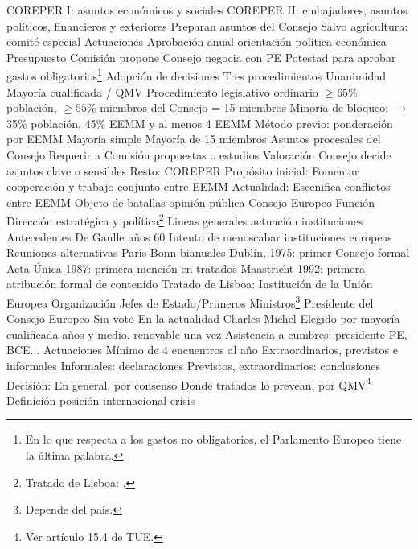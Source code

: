 \documentclass{nuevotema}
\begin{document}
\begin{esquemal}
				\4[] COREPER I: asuntos económicos y sociales
				\4[] COREPER II: embajadores, asuntos políticos, financieros y exteriores
				\4[] Preparan asuntos del Consejo
				\4[] Salvo agricultura: comité especial
			\3 Actuaciones
				\4 Aprobación anual orientación política económica
				\4 Presupuesto
				\4[] Comisión propone
				\4[] Consejo negocia con PE
				\4[] Potestad para aprobar gastos obligatorios\footnote{En lo que respecta a los gastos no obligatorios, el Parlamento Europeo tiene la última palabra.}
				\4 Adopción de decisiones
				\4[] Tres procedimientos
				\4[1] Unanimidad
				\4[2] Mayoría cualificada / QMV
				\4[] Procedimiento legislativo ordinario
				\4[] $\geq 65\%$ población, $\geq 55\%$ miembros del Consejo = 15 miembros
				\4[] Minoría de bloqueo:
				\4[] $\to$ 35\% población, 45\% EEMM y al menos 4 EEMM
				\4[] Método previo: ponderación por EEMM
				\4[3] Mayoría simple
				\4[] Mayoría de 15 miembros
				\4[] Asuntos procesales del Consejo
				\4[] Requerir a Comisión propuestas o estudios
			\3 Valoración
				\4 Consejo decide asuntos clave o sensibles
				\4[] Resto: COREPER
				\4 Propósito inicial:
				\4[] Fomentar cooperación y trabajo conjunto entre EEMM
				\4 Actualidad:
				\4[] Escenifica conflictos entre EEMM
				\4[] Objeto de batallas opinión pública
		\2 Consejo Europeo
			\3 Función
				\4 Dirección estratégica y política\footnote{Tratado de Lisboa: .}
				\4 Lineas generales actuación instituciones
			\3 Antecedentes
				\4 De Gaulle años 60
				\4[] Intento de menoscabar instituciones europeas
				\4 Reuniones alternativas París-Bonn bianuales
				\4 Dublín, 1975: primer Consejo formal
				\4 Acta Única 1987: primera mención en tratados
				\4 Maastricht 1992:
				\4[] primera atribución formal de contenido
				\4 Tratado de Lisboa:
				\4[] Institución de la Unión Europea
			\3 Organización
				\4 Jefes de Estado/Primeros Ministros\footnote{Depende del país.}
				\4 Presidente del Consejo Europeo
				\4[] Sin voto
				\4[] En la actualidad Charles Michel
				\4[] Elegido por mayoría cualificada
				 años y medio, renovable una vez
				\4 Asistencia a cumbres: presidente PE, BCE...
			\3 Actuaciones
				\4 Mínimo de 4 encuentros al año
				\4[] Extraordinarios, previstos e informales
				\4 Informales: declaraciones
				\4 Previstos, extraordinarios: conclusiones
				\4 Decisión:
				\4[] En general, por consenso
				\4[] Donde tratados lo prevean, por QMV\footnote{Ver artículo 15.4 de TUE.}
				\4 Definición posición internacional crisis

\end{esquemal}
\end{document}
